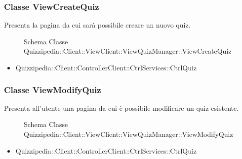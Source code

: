 \subsubsection{Classe ViewCreateQuiz}
Presenta la pagina da cui sarà possibile creare un nuovo quiz.
\begin{figure}[H]
\centering
\noindent{}
\caption{Schema Classe Quizzipedia::Client::ViewClient::ViewQuizManager::ViewCreateQuiz}
\end{figure}
\begin{itemize}
\item Quizzipedia::Client::ControllerClient::CtrlServices::CtrlQuiz
\end{itemize}
\subsubsection{Classe ViewModifyQuiz}
Presenta all'utente una pagina da cui è possibile modificare un quiz esistente.
\begin{figure}[H]
\centering
\noindent{}
\caption{Schema Classe Quizzipedia::Client::ViewClient::ViewQuizManager::ViewModifyQuiz}
\end{figure}
\begin{itemize}
\item Quizzipedia::Client::ControllerClient::CtrlServices::CtrlQuiz
\end{itemize}
